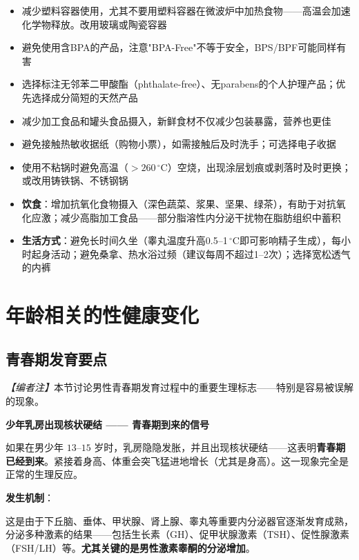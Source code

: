 \begin{itemize}[leftmargin=2cm]
	\item 减少塑料容器使用，尤其不要用塑料容器在微波炉中加热食物——高温会加速化学物释放。改用玻璃或陶瓷容器
	\item 避免使用含BPA的产品，注意"BPA-Free"不等于安全，BPS/BPF可能同样有害
	\item 选择标注无邻苯二甲酸酯（phthalate-free）、无parabens的个人护理产品；优先选择成分简短的天然产品
	\item 减少加工食品和罐头食品摄入，新鲜食材不仅减少包装暴露，营养也更佳
	\item 避免接触热敏收据纸（购物小票），如需接触后及时洗手；可选择电子收据
	\item 使用不粘锅时避免高温（$>260\,^\circ$C）空烧，出现涂层划痕或剥落时及时更换；或改用铸铁锅、不锈钢锅
	\item \textbf{饮食}：增加抗氧化食物摄入（深色蔬菜、浆果、坚果、绿茶），有助于对抗氧化应激；减少高脂加工食品——部分脂溶性内分泌干扰物在脂肪组织中蓄积
	\item \textbf{生活方式}：避免长时间久坐（睾丸温度升高0.5--1$\,^\circ$C即可影响精子生成），每小时起身活动；避免桑拿、热水浴过频（建议每周不超过1--2次）；选择宽松透气的内裤
\end{itemize}

\section{年龄相关的性健康变化}
\subsection{青春期发育要点}

\noindent\textit{【编者注】}本节讨论男性青春期发育过程中的重要生理标志——特别是容易被误解的现象。

\vspace{0.5em}
\noindent\textbf{少年乳房出现核状硬结 —— 青春期到来的信号}

如果在男少年 $13$--$15$ 岁时，乳房隐隐发胀，并且出现核状硬结——这表明\textbf{青春期已经到来}。紧接着身高、体重会突飞猛进地增长（尤其是身高）。这一现象完全是正常的生理反应。

\vspace{0.5em}
\noindent\textbf{发生机制}：

这是由于下丘脑、垂体、甲状腺、肾上腺、睾丸等重要内分泌器官逐渐发育成熟，分泌多种激素的结果——包括生长素（GH）、促甲状腺激素（TSH）、促性腺激素（FSH/LH）等。\textbf{尤其关键的是男性激素睾酮的分泌增加}。

